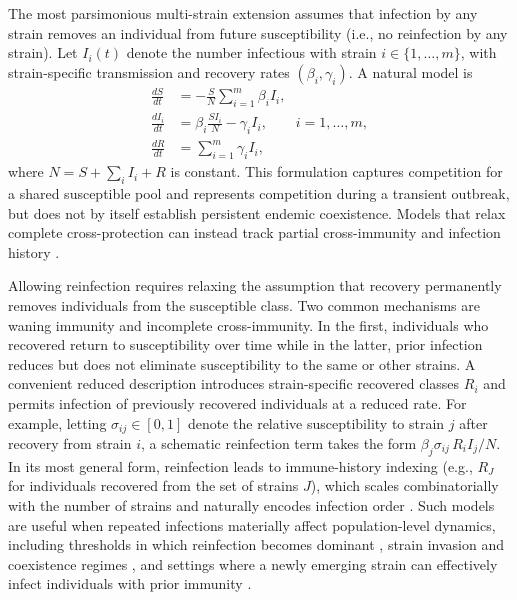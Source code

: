 \documentclass[11pt,a4paper]{article}
\begin{document}
The most parsimonious multi-strain extension assumes that infection by any strain removes an individual from
future susceptibility (i.e., no reinfection by any strain). Let $I_i(t)$ denote the number infectious with strain
$i\in\{1,\dots,m\}$, with strain-specific transmission and recovery rates $(\beta_i,\gamma_i)$. A natural model is
\begin{equation}
\label{eq:ms_sir_no_reinf}
\begin{aligned}
\frac{dS}{dt} &= -\frac{S}{N}\sum_{i=1}^m \beta_i I_i,\\
\frac{dI_i}{dt} &= \beta_i \frac{S I_i}{N} - \gamma_i I_i, \qquad i=1,\dots,m,\\
\frac{dR}{dt} &= \sum_{i=1}^m \gamma_i I_i,
\end{aligned}
\end{equation}
where $N=S+\sum_i I_i+R$ is constant. This formulation captures competition for a shared susceptible pool and
represents competition during a transient outbreak, but does not by itself establish persistent endemic coexistence. Models that relax complete cross-protection can instead track partial cross-immunity and infection history \cite{Andreasen1997Cocirculating,GogGrenfell2002ManyStrain,MinayevFerguson2009Realism}.

Allowing reinfection requires relaxing the assumption that recovery permanently removes individuals from the
susceptible class. Two common mechanisms are waning immunity and incomplete cross-immunity. In the first, individuals who recovered return to susceptibility over time while in the latter, prior infection reduces but does not eliminate susceptibility to the same or other strains. A convenient reduced description introduces strain-specific recovered classes $R_i$ and permits infection of
previously recovered individuals at a reduced rate. For example, letting $\sigma_{ij}\in[0,1]$ denote the relative
susceptibility to strain $j$ after recovery from strain $i$, a schematic reinfection term takes the form
$\beta_j \sigma_{ij} \, R_i I_j/N$. In its most general form, reinfection leads to immune-history indexing
(e.g., $R_J$ for individuals recovered from the set of strains $J$), which scales combinatorially with the number
of strains and naturally encodes infection order \cite{lazebnik2022generic}.
Such models are useful when repeated infections materially affect population-level dynamics, including thresholds
in which reinfection becomes dominant \cite{GomesWhiteMedley2005ReinfectionThreshold}, strain invasion and
coexistence regimes \cite{NunesTeloDaGamaGomes2006LocalizedContacts}, and settings where a newly emerging
strain can effectively infect individuals with prior immunity \cite{FudoligHoward2020LocalStability}.
\end{document}
